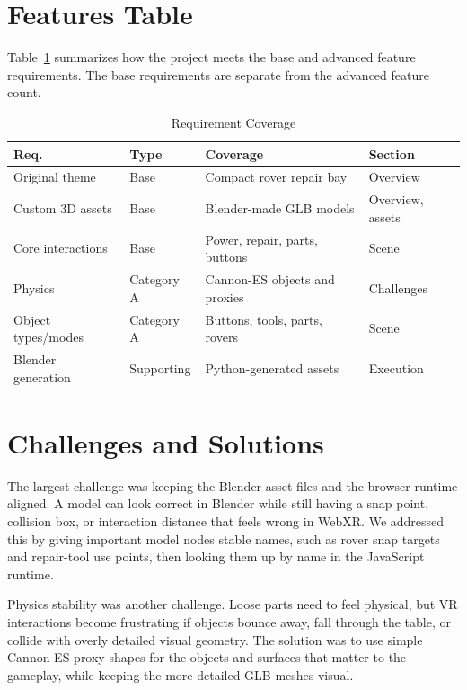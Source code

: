 \documentclass[conference]{IEEEtran}
\begin{document}
\section{Features Table}

Table~\ref{tab:features} summarizes how the project meets the base and advanced
feature requirements. The base requirements are separate from the advanced
feature count.

\begin{table}[t]
	\caption{Requirement Coverage}\label{tab:features}
	\centering
	\footnotesize
	\begin{tabular}{llll}
		\toprule
		\textbf{Req.}      & \textbf{Type} & \textbf{Coverage}             & \textbf{Section} \\
		\midrule
		Original theme     & Base          & Compact rover repair bay      & Overview         \\
		Custom 3D assets   & Base          & Blender-made GLB models       & Overview, assets \\
		Core interactions  & Base          & Power, repair, parts, buttons & Scene            \\
		Physics            & Category A    & Cannon-ES objects and proxies & Challenges       \\
		Object types/modes & Category A    & Buttons, tools, parts, rovers & Scene            \\
		Blender generation & Supporting    & Python-generated assets       & Execution        \\
		\bottomrule
	\end{tabular}
\end{table}

\section{Challenges and Solutions}

The largest challenge was keeping the Blender asset files and the browser
runtime aligned. A model can look correct in Blender while still having a snap
point, collision box, or interaction distance that feels wrong in WebXR\@. We
addressed this by giving important model nodes stable names, such as rover snap
targets and repair-tool use points, then looking them up by name in the
JavaScript runtime.

Physics stability was another challenge. Loose parts need to feel physical, but
VR interactions become frustrating if objects bounce away, fall through the
table, or collide with overly detailed visual geometry. The solution was to use
simple Cannon-ES proxy shapes for the objects and surfaces that matter to the
gameplay, while keeping the more detailed GLB meshes visual.
\end{document}
